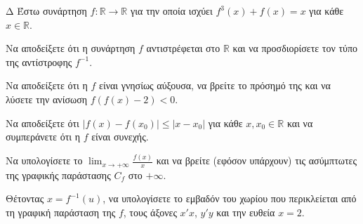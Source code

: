 \begin{thema}{Δ}
Έστω συνάρτηση $f:\mathbb{R}\to\mathbb{R}$ για την οποία ισχύει $f^3(x) + f(x) = x$ για κάθε $x \in \mathbb{R}$.
\begin{erwthma}
    \item Να αποδείξετε ότι η συνάρτηση $f$ αντιστρέφεται στο $\mathbb{R}$ και να προσδιορίσετε τον τύπο της αντίστροφης $f^{-1}$.
    \item Να αποδείξετε ότι η $f$ είναι γνησίως αύξουσα, να βρείτε το πρόσημό της και να λύσετε την ανίσωση $f(f(x) - 2) < 0$.
    \item Να αποδείξετε ότι $|f(x) - f(x_0)| \le |x - x_0|$ για κάθε $x, x_0 \in \mathbb{R}$ και να συμπεράνετε ότι η $f$ είναι συνεχής.
    \item Να υπολογίσετε το $\displaystyle\lim_{x\to +\infty} \frac{f(x)}{x}$ και να βρείτε (εφόσον υπάρχουν) τις ασύμπτωτες της γραφικής παράστασης $C_f$ στο $+\infty$.
    \item Θέτοντας $x = f^{-1}(u)$, να υπολογίσετε το εμβαδόν του χωρίου που περικλείεται από τη γραφική παράσταση της $f$, τους άξονες $x'x$, $y'y$ και την ευθεία $x=2$.
\end{erwthma}
\end{thema}
